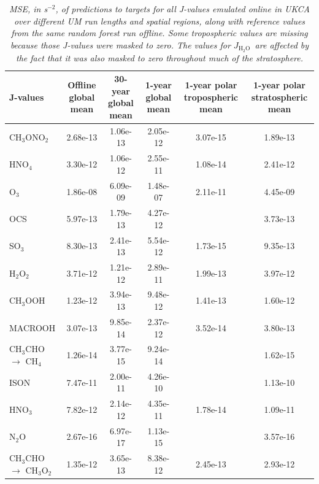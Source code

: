 \documentclass[journal abbreviation, manuscript]{copernicus}
\newcommand{\JHHO}{\ensuremath{J_{\mathrm{H_2O}}}}
\begin{document}
\begin{table}
\centering
\caption{\textit{MSE, in s$^{-2}$, of predictions to targets for all J-values emulated online in UKCA over different UM run lengths and spatial regions, along with reference values from the same random forest run offline. Some tropospheric values are missing because those J-values were masked to zero. The values for \JHHO\ are affected by the fact that it was also masked to zero throughout much of the stratosphere.}}
\begin{adjustbox}{max width=\textheight}
\begin{tabular}{|l
S[scientific-notation=true]
S[scientific-notation=true]
S[scientific-notation=true]
S[scientific-notation=true]
S[scientific-notation=true]|}
\toprule
J-values &
{Offline global mean} &
{30-year global mean} &
{1-year global mean} &
{1-year polar tropospheric mean} &
{1-year polar stratospheric mean} \\
\midrule
CH$_3$ONO$_2$        & 2.68e-13 & 1.06e-13 & 2.05e-12 & 3.07e-15 & 1.89e-13 \\
HNO$_4$              & 3.30e-12 & 1.06e-12 & 2.55e-11 & 1.08e-14 & 2.41e-12 \\
O$_3$                & 1.86e-08 & 6.09e-09 & 1.48e-07 & 2.11e-11 & 4.45e-09 \\
OCS                  & 5.97e-13 & 1.79e-13 & 4.27e-12 & {}        & 3.73e-13 \\
SO$_3$               & 8.30e-13 & 2.41e-13 & 5.54e-12 & 1.73e-15 & 9.35e-13 \\
H$_2$O$_2$           & 3.71e-12 & 1.21e-12 & 2.89e-11 & 1.99e-13 & 3.97e-12 \\
CH$_3$OOH            & 1.23e-12 & 3.94e-13 & 9.48e-12 & 1.41e-13 & 1.60e-12 \\
MACROOH              & 3.07e-13 & 9.85e-14 & 2.37e-12 & 3.52e-14 & 3.80e-13 \\
CH$_3$CHO $\rightarrow$ CH$_4$ & 1.26e-14 & 3.77e-15 & 9.24e-14 & {} & 1.62e-15 \\
ISON                 & 7.47e-11 & 2.00e-11 & 4.26e-10 & {} & 1.13e-10 \\
HNO$_3$              & 7.82e-12 & 2.14e-12 & 4.35e-11 & 1.78e-14 & 1.09e-11 \\
N$_2$O               & 2.67e-16 & 6.97e-17 & 1.13e-15 & {} & 3.57e-16 \\
CH$_3$CHO $\rightarrow$ CH$_3$O$_2$ & 1.35e-12 & 3.65e-13 & 8.38e-12 & 2.45e-13 & 2.93e-12 \\

\end{tabular}
\end{adjustbox}
\end{table}
\end{document}
